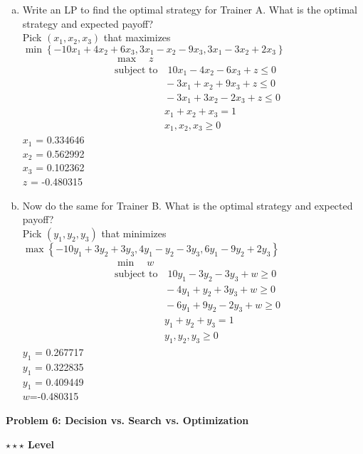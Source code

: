 \documentclass{article}\usepackage[utf8]{inputenc}\usepackage[margin=0.4cm,top=0.4cm,bottom=0.4cm]{geometry}\usepackage[usenames,dvipsnames,svgnames,table]{xcolor}
\begin{document}
\begin{enumerate}[(a)]
\item Write an LP to find the optimal strategy for Trainer A. What is the optimal strategy and expected payoff?
\BeginSolution %
\\
Pick $(x_1,x_2,x_3)$ that maximizes $\min\left\{-10x_1 + 4x_2 + 6x_3, 3x_1 - x_2 - 9x_3, 3x_1 - 3x_2 + 2x_3\right\}$
%
\begin{align*}
	&\max\quad z \\
	&\text{subject to}\quad 10x_1 - 4x_2 - 6x_3 + z \leq 0 \\
	&\qquad\qquad\quad -3x_1 + x_2 + 9x_3 + z \leq 0 \\
	&\qquad\qquad\quad -3x_1 + 3x_2 - 2x_3 + z \leq 0 \\
	&\qquad\qquad\quad x_1 + x_2 + x_3 = 1 \\
	&\qquad\qquad\quad x_1, x_2, x_3 \geq 0
\end{align*}
%
$x_1$ = 0.334646 \\
$x_2$ = 0.562992 \\
$x_3$ = 0.102362 \\
$z$ = -0.480315
\EndSolution
\item Now do the same for Trainer B. What is the optimal strategy and expected payoff?
\BeginSolution %
\\
Pick $(y_1,y_2,y_3)$ that minimizes $\max\left\{-10y_1 + 3y_2 + 3y_3, 4y_1 - y_2 - 3y_3, 6y_1 - 9y_2 + 2y_3\right\}$
%
\begin{align*}
	&\min\quad w \\
	&\text{subject to}\quad 10y_1 - 3y_2 - 3y_3 + w \geq 0 \\
	&\qquad\qquad\quad -4y_1 + y_2 + 3y_3 + w \geq 0 \\
	&\qquad\qquad\quad -6y_1 + 9y_2 - 2y_3 + w \geq 0 \\
	&\qquad\qquad\quad y_1 + y_2 + y_3 = 1 \\
	&\qquad\qquad\quad y_1, y_2, y_3 \geq 0
\end{align*}
%
$y_1$ = 0.267717 \\
$y_1$ = 0.322835 \\
$y_1$ = 0.409449 \\
$w$=-0.480315
\EndSolution
\end{enumerate}
\clearpage


\vspace{-2mm}\noindent\begin{mybox}{\begin{center}\textbf{\color{black}Problem 6: Decision vs. Search vs. Optimization}\end{center}}\end{mybox}\vspace{-2mm}
\begin{myboxot}\noindent\textbf{$\star\star\star$ Level}\end{myboxot} 
\end{document}
